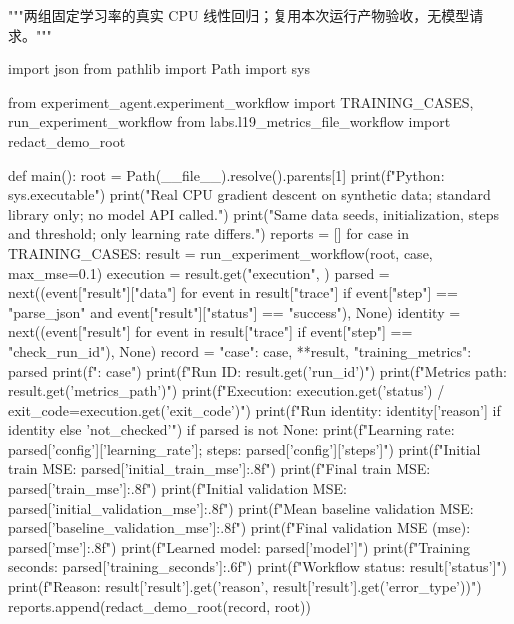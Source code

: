 \documentclass[UTF8,zihao=-4,fontset=fandol]{ctexart}
\begin{document}
\begin{Code}
"""两组固定学习率的真实 CPU 线性回归；复用本次运行产物验收，无模型请求。"""

import json
from pathlib import Path
import sys

from experiment_agent.experiment_workflow import TRAINING_CASES, run_experiment_workflow
from labs.l19_metrics_file_workflow import redact_demo_root


def main():
    root = Path(__file__).resolve().parents[1]
    print(f"Python: {sys.executable}")
    print("Real CPU gradient descent on synthetic data; standard library only; no model API called.")
    print("Same data seeds, initialization, steps and threshold; only learning rate differs.")
    reports = []
    for case in TRAINING_CASES:
        result = run_experiment_workflow(root, case, max_mse=0.1)
        execution = result.get("execution", {})
        parsed = next((event["result"]["data"] for event in result["trace"]
                       if event["step"] == "parse_json" and event["result"]["status"] == "success"), None)
        identity = next((event["result"] for event in result["trace"] if event["step"] == "check_run_id"), None)
        record = {"case": case, **result, "training_metrics": parsed}
        print(f"\nCase: {case}")
        print(f"Run ID: {result.get('run_id')}")
        print(f"Metrics path: {result.get('metrics_path')}")
        print(f"Execution: {execution.get('status')} / exit_code={execution.get('exit_code')}")
        print(f"Run identity: {identity['reason'] if identity else 'not_checked'}")
        if parsed is not None:
            print(f"Learning rate: {parsed['config']['learning_rate']}; steps: {parsed['config']['steps']}")
            print(f"Initial train MSE: {parsed['initial_train_mse']:.8f}")
            print(f"Final train MSE: {parsed['train_mse']:.8f}")
            print(f"Initial validation MSE: {parsed['initial_validation_mse']:.8f}")
            print(f"Mean baseline validation MSE: {parsed['baseline_validation_mse']:.8f}")
            print(f"Final validation MSE (mse): {parsed['mse']:.8f}")
            print(f"Learned model: {parsed['model']}")
            print(f"Training seconds: {parsed['training_seconds']:.6f}")
        print(f"Workflow status: {result['status']}")
        print(f"Reason: {result['result'].get('reason', result['result'].get('error_type'))}")
        reports.append(redact_demo_root(record, root))


\end{Code}
\end{document}
